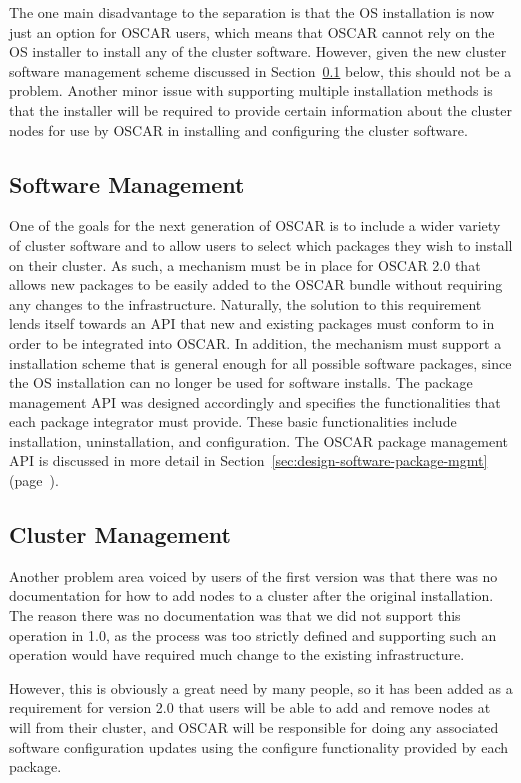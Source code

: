 The one main disadvantage to the separation is that the OS
installation is now just an option for OSCAR users, which means that
OSCAR cannot rely on the OS installer to install any of the cluster
software. However, given the new cluster software management scheme
discussed in Section~\ref{sec:reqs-software-management} below, this
should not be a problem. Another minor issue with supporting multiple
installation methods is that the installer will be required to provide
certain information about the cluster nodes for use by OSCAR in
installing and configuring the cluster software.

\subsection{Software Management}
\label{sec:reqs-software-management}

One of the goals for the next generation of OSCAR is to include a
wider variety of cluster software and to allow users to select which
packages they wish to install on their cluster. As such, a mechanism
must be in place for OSCAR 2.0 that allows new packages to be easily
added to the OSCAR bundle without requiring any changes to the
infrastructure. Naturally, the solution to this requirement lends
itself towards an API that new and existing packages must conform to
in order to be integrated into OSCAR. In addition, the mechanism must
support a installation scheme that is general enough for all possible
software packages, since the OS installation can no longer be used for
software installs. The package management API was designed accordingly
and specifies the functionalities that each package integrator must
provide. These basic functionalities include installation,
uninstallation, and configuration. The OSCAR package management API is
discussed in more detail in
Section~\ref{sec:design-software-package-mgmt}
(page~\pageref{sec:design-software-package-mgmt}).

\subsection{Cluster Management}

Another problem area voiced by users of the first version was that
there was no documentation for how to add nodes to a cluster after the
original installation. The reason there was no documentation was that
we did not support this operation in 1.0, as the process was too
strictly defined and supporting such an operation would have required
much change to the existing infrastructure.

However, this is obviously a great need by many people, so it has been
added as a requirement for version 2.0 that users will be able to add
and remove nodes at will from their cluster, and OSCAR will be
responsible for doing any associated software configuration updates
using the configure functionality provided by each package.

